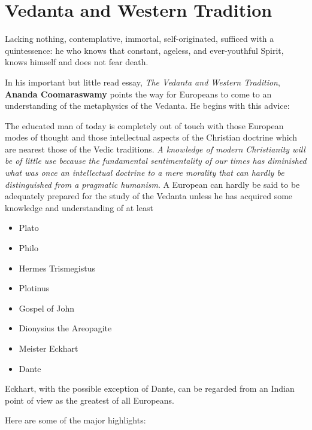 \section{Vedanta and Western Tradition}

\begin{quotex}
Lacking nothing, contemplative, immortal, self-originated, sufficed with a quintessence: he who knows that constant, ageless, and ever-youthful Spirit, knows himself and does not fear death.


\end{quotex}
In his important but little read essay, \emph{The Vedanta and Western Tradition}, \textbf{Ananda Coomaraswamy} points the way for Europeans to come to an understanding of the metaphysics of the Vedanta. He begins with this advice:

\begin{quotex}
The educated man of today is completely out of touch with those European modes of thought and those intellectual aspects of the Christian doctrine which are nearest those of the Vedic traditions. \emph{A knowledge of modern Christianity will be of little use because the fundamental sentimentality of our times has diminished what was once an intellectual doctrine to a mere morality that can hardly be distinguished from a pragmatic humanism}. A European can hardly be said to be adequately prepared for the study of the Vedanta unless he has acquired some knowledge and understanding of at least

\end{quotex}
\begin{itemize}[nosep]\small
\item Plato 
\item Philo 
\item Hermes Trismegistus 
\item Plotinus 
\item Gospel of John 
\item Dionysius the Areopagite 
\item Meister Eckhart 
\item Dante 
\end{itemize}
\begin{quotex}
Eckhart, with the possible exception of Dante, can be regarded from an Indian point of view as the greatest of all Europeans. 

\end{quotex}
Here are some of the major highlights:

